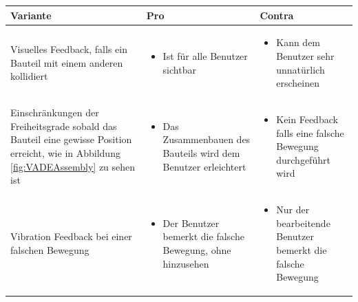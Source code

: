\begin{center}
	\begin{tabularx} {\textwidth} { | B | B | B | }
		\hline
		\color{white} \textbf{Variante} & \color{white} \textbf{Pro} & 
		\color{white} \textbf{Contra} \\
		\hline
		\vspace{1pt}
		Visuelles Feedback, falls ein Bauteil mit einem anderen kollidiert & 
		\begin{itemize} [leftmargin=*,noitemsep,topsep=0pt]
			\item Ist für alle Benutzer sichtbar
		\end{itemize} &
		\begin{itemize} [leftmargin=*,noitemsep,topsep=0pt]
			\item Kann dem Benutzer sehr unnatürlich erscheinen
		\end{itemize} \\
		\hline
		\vspace{1pt}
		Einschränkungen der Freiheitsgrade sobald das Bauteil eine gewisse Position erreicht, wie in Abbildung \ref{fig:VADEAssembly} zu sehen ist 
		\vspace{2pt} & 
		\begin{itemize} [leftmargin=*,noitemsep,topsep=0pt]
			\item Das Zusammenbauen des Bauteils wird dem Benutzer erleichtert
		\end{itemize} &
		\begin{itemize} [leftmargin=*,noitemsep,topsep=0pt]
			\item Kein Feedback falls eine falsche Bewegung durchgeführt wird
		\end{itemize} \\
		\hline
		\vspace{1pt}
		Vibration Feedback bei einer falschen Bewegung & 
		\begin{itemize} [leftmargin=*,noitemsep,topsep=0pt]
			\item Der Benutzer bemerkt die falsche Bewegung, ohne hinzusehen
		\end{itemize} &
		\begin{itemize} [leftmargin=*,noitemsep,topsep=0pt]
			\item Nur der bearbeitende Benutzer bemerkt die falsche Bewegung
		\end{itemize} \\
		\hline	
	\end{tabularx}
\end{center}
\label{tbl:varianten_zusammenbau}

